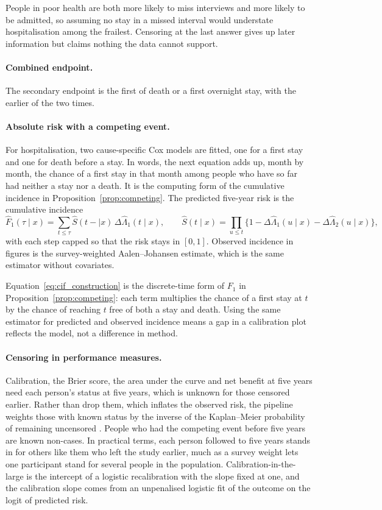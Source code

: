 People in poor health are both more likely to miss interviews and more likely to be admitted, so assuming no stay in a missed interval would understate hospitalisation among the frailest. Censoring at the last answer gives up later information but claims nothing the data cannot support.

\paragraph{Combined endpoint.} The secondary endpoint is the first of death or a first overnight stay, with the earlier of the two times.

\paragraph{Absolute risk with a competing event.} For hospitalisation, two cause-specific Cox models are fitted, one for a first stay and one for death before a stay. In words, the next equation adds up, month by month, the chance of a first stay in that month among people who have so far had neither a stay nor a death. It is the computing form of the cumulative incidence in Proposition~\ref{prop:competing}. The predicted five-year risk is the cumulative incidence
\begin{equation}
\hat F_1(\tau\mid x)=\sum_{t\le\tau}\hat S(t-\mid x)\,\Delta\hat\Lambda_1(t\mid x),\qquad
\hat S(t\mid x)=\prod_{u\le t}\bigl\{1-\Delta\hat\Lambda_1(u\mid x)-\Delta\hat\Lambda_2(u\mid x)\bigr\},
\label{eq:cif_construction}
\end{equation}
with each step capped so that the risk stays in $[0,1]$. Observed incidence in figures is the survey-weighted Aalen--Johansen estimate, which is the same estimator without covariates.

Equation~\eqref{eq:cif_construction} is the discrete-time form of $F_1$ in Proposition~\ref{prop:competing}: each term multiplies the chance of a first stay at $t$ by the chance of reaching $t$ free of both a stay and death. Using the same estimator for predicted and observed incidence means a gap in a calibration plot reflects the model, not a difference in method.

\paragraph{Censoring in performance measures.} Calibration, the Brier score, the area under the curve and net benefit at five years need each person's status at five years, which is unknown for those censored earlier. Rather than drop them, which inflates the observed risk, the pipeline weights those with known status by the inverse of the Kaplan--Meier probability of remaining uncensored \citep{blanche_2013,steyerberg_2019}. People who had the competing event before five years are known non-cases. In practical terms, each person followed to five years stands in for others like them who left the study earlier, much as a survey weight lets one participant stand for several people in the population. Calibration-in-the-large is the intercept of a logistic recalibration with the slope fixed at one, and the calibration slope comes from an unpenalised logistic fit of the outcome on the logit of predicted risk.

